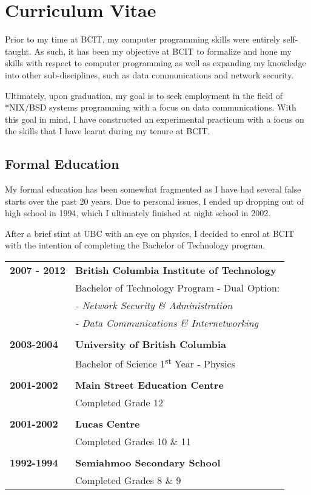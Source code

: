 \chapter{Curriculum Vitae}
\label{chp:Curriculum Vitae}
Prior to my time at BCIT, my computer programming skills were entirely self-taught. As such, it has been my objective at BCIT to formalize and hone my skills with respect to computer programming as well as expanding my knowledge into other sub-disciplines, such as data communications and network security.

Ultimately, upon graduation, my goal is to seek employment in the field of *NIX/BSD systems programming with a focus on data communications. With this goal in mind, I have constructed an experimental practicum with a focus on the skills that I have learnt during my tenure at BCIT.

\clearpage
\section{Formal Education}
My formal education has been somewhat fragmented as I have had several false starts over the past 20 years. Due to personal issues, I ended up dropping out of high school in 1994, which I ultimately finished at night school in 2002.

After a brief stint at UBC with an eye on physics, I decided to enrol at BCIT with the intention of completing the Bachelor of Technology program. \\

\noindent
\begin{tabular}{l l}
\textbf{2007 - 2012} & \textbf{British Columbia Institute of Technology} \\
& Bachelor of Technology Program - Dual Option: \\
& \emph{- Network Security \& Administration} \\
& \emph{- Data Communications \& Internetworking} \\
& \\
\textbf{2003-2004} & \textbf{University of British Columbia} \\
& Bachelor of Science 1\textsuperscript{st} Year - Physics \\
& \\
\textbf{2001-2002} & \textbf{Main Street Education Centre} \\
& Completed Grade 12 \\
& \\
\textbf{2001-2002} & \textbf{Lucas Centre} \\
& Completed Grades 10 \& 11 \\
& \\
\textbf{1992-1994} & \textbf{Semiahmoo Secondary School} \\
& Completed Grades 8 \& 9 \\
\end{tabular}

